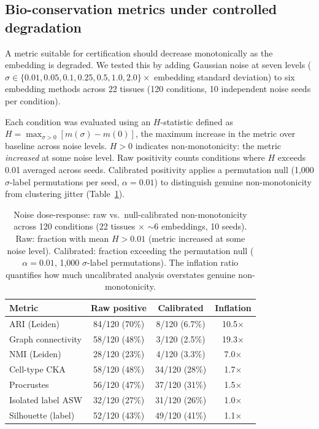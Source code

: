 \documentclass[11pt]{article}
\begin{document}
\subsection{Bio-conservation metrics under controlled degradation}
\label{sec:noise}

A metric suitable for certification should decrease monotonically as the
embedding is degraded. We tested this by adding Gaussian noise at seven
levels ($\sigma \in \{0.01, 0.05, 0.1, 0.25, 0.5, 1.0, 2.0\} \times$
embedding standard deviation) to six embedding methods across 22
tissues (120 conditions, 10 independent noise seeds per condition).

Each condition was evaluated using an $H$-statistic defined as
$H = \max_{\sigma > 0}[m(\sigma) - m(0)]$, the maximum increase in
the metric over baseline across noise levels. $H > 0$ indicates non-monotonicity:
the metric \emph{increased} at some noise level. Raw positivity
counts conditions where $H$ exceeds 0.01 averaged across seeds.
Calibrated positivity applies a permutation null (1{,}000
$\sigma$-label permutations per seed, $\alpha = 0.01$) to
distinguish genuine non-monotonicity from clustering jitter
(Table~\ref{tab:noise}).

\begin{table}[t]
\centering
\caption{Noise dose-response: raw vs.\ null-calibrated
non-monotonicity across 120 conditions (22 tissues $\times$ $\sim$6
embeddings, 10 seeds). Raw: fraction with mean $H > 0.01$ (metric
increased at some noise level). Calibrated: fraction exceeding the
permutation null ($\alpha = 0.01$, 1{,}000 $\sigma$-label
permutations). The inflation ratio quantifies how much uncalibrated
analysis overstates genuine non-monotonicity.}
\label{tab:noise}
\small
\begin{tabular}{@{}lccc@{}}
\toprule
Metric & Raw positive & Calibrated & Inflation \\
\midrule
ARI (Leiden)         & 84/120 (70\%) &  8/120 (6.7\%)  & 10.5$\times$ \\
Graph connectivity   & 58/120 (48\%) &  3/120 (2.5\%)  & 19.3$\times$ \\
NMI (Leiden)         & 28/120 (23\%) &  4/120 (3.3\%)  &  7.0$\times$ \\
\midrule
Cell-type CKA        & 58/120 (48\%) & 34/120 (28\%)   &  1.7$\times$ \\
Procrustes           & 56/120 (47\%) & 37/120 (31\%)   &  1.5$\times$ \\
\midrule
Isolated label ASW   & 32/120 (27\%) & 31/120 (26\%)   &  1.0$\times$ \\
Silhouette (label)   & 52/120 (43\%) & 49/120 (41\%)   &  1.1$\times$ \\
\bottomrule
\end{tabular}
\end{table}
\end{document}
